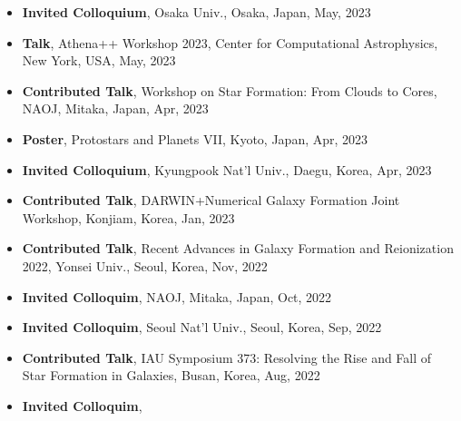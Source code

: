 \documentclass[11pt,letterpaper,roman]{moderncv}        %
\newenvironment{benumerate}[1]{
  \let\oldItem\item
  \def\item{\addtocounter{enumi}{-2}\oldItem}
  \begin{enumerate}[itemsep=0.0mm]
    \setcounter{enumi}{#1}
    \addtocounter{enumi}{1}
  }{
  \end{enumerate}
}
\begin{document}
\begin{itemize}
  \setlength\itemsep{0em}
\item \textbf{Invited Colloquium},
  Osaka Univ., Osaka, Japan, May, 2023 %
\item \textbf{Talk},
  Athena++ Workshop 2023, Center for Computational Astrophysics, New York, USA, May, 2023 %
\item \textbf{Contributed Talk},
  Workshop on Star Formation: From Clouds to Cores, NAOJ, Mitaka, Japan, Apr, 2023 %
\item \textbf{Poster},
  Protostars and Planets VII, Kyoto, Japan, Apr, 2023 %
\item \textbf{Invited Colloquium},
  Kyungpook Nat'l Univ., Daegu, Korea, Apr, 2023 %
\item \textbf{Contributed Talk},
  DARWIN+Numerical Galaxy Formation Joint Workshop, Konjiam, Korea, Jan, 2023 %
\item \textbf{Contributed Talk},
  Recent Advances in Galaxy Formation and Reionization 2022, Yonsei Univ., Seoul, Korea, Nov, 2022 %
\item \textbf{Invited Colloquim},
  NAOJ, Mitaka, Japan, Oct, 2022 %
\item \textbf{Invited Colloquim},
  Seoul Nat'l Univ., Seoul, Korea, Sep, 2022 %
\item \textbf{Contributed Talk},
  IAU Symposium 373: Resolving the Rise and Fall of Star Formation in Galaxies, Busan, Korea, Aug, 2022 %
\item \textbf{Invited Colloquim},

\end{itemize}
\end{document}
